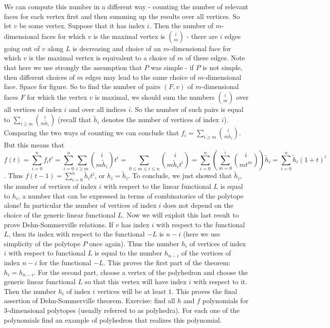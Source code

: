 We can compute this number in a different way - counting the number of relevant faces for each vertex first and then summing up the results over all vertices. So let $v$ be some vertex. Suppose that it has index $i$. Then the number of $m$-dimensional faces for which $v$ is the maximal vertex is $i \choose m$ - there are $i$ edges going out of $v$ along $L$ is decreasing and choice of an $m$-dimensional face for which $v$ is the maximal vertex is equivalent to a choice of $m$ of these edges.
Note that here we use strongly the assumption that $P$ was simple - if $P$ is not simple, then different choices of $m$ edges may lead to the same choice of $m$-dimensional face.
Space for figure.
So to find the number of pairs $(F,v)$ of $m$-dimensional faces $F$ for which the vertex $v$ is maximal, we should sum the numbers $i \choose m$ over all vertices of index $i$ and over all indices $i$. So the number of such pairs is equal to $\sum_{i\ge m}{i\choose m \tilde{h}_i}$ (recall that $\tilde{h}_i$ denotes the number of vertices of index $i$).
Comparing the two ways of counting we can conclude that $f_i=\sum_{i\ge m}{i\choose m \tilde{h}_i}$. But this means that $$f(t)=\sum_{i=0}^n{f_i t^i}=\sum_{i=0}^n{\sum_{i\ge m}{i\choose m \tilde{h}_i} t^i}=\sum_{0\le m \le i \le n}{i\choose m \tilde{h}_i t^i}=\sum_{i=0}^n{(\sum_{m=0}^i{i \choose m t^m})\tilde{h}_i}=\sum_{i=0}^n{\tilde{h}_i(1+t)^i}$$.
Thus $f(t-1)=\sum_{i=0}^n{\tilde{h}_i t^i}$, or $h_i=\tilde{h}_i$.
To conclude, we just showed that $\tilde{h}_i$, the number of vertices of index $i$ with respect to the linear functional $L$ is equal to $h_i$, a number that can be expressed in terms of combinatorics of the polytope alone! In particular the number of vertices of index $i$ does not depend on the choice of the generic linear functional $L$.
Now we will exploit this last result to prove Dehn-Sommerville relations. If $v$ has index $i$ with respect to the functional $L$, then its index with respect to the functional $-L$ is $n-i$ (here we use simplicity of the polytope $P$ once again). Thus the number $h_i$ of vertices of index $i$ with respect to functional $L$ is equal to the number $h_{n-i}$ of the vertices of index $n-i$ for the functional $-L$. This proves the first part of the theorem: $h_i=h_{n-i}$.
For the second part, choose a vertex of the polyhedron and choose the generic linear functional $L$ so that this vertex will have index $i$ with respect to it. Then the number $h_i$ of index $i$ vertices will be at least $1$.
This proves the final assertion of Dehn-Sommerville theorem.
Exercise: find all $h$ and $f$ polynomials for 3-dimensional polytopes (usually referred to as polyhedra). For each one of the polynomials find an example of polyhedron that realizes this polynomial.
